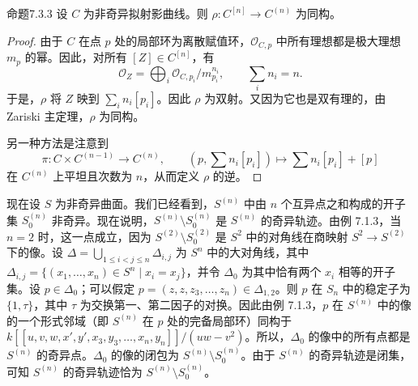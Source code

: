 \begin{origstatement}{命题}{7.3.3}\label{ch07:7.3.3}
设 $C$ 为非奇异拟射影曲线。则 $\rho:C^{[n]}\to C^{(n)}$ 为同构。
\end{origstatement}
\begin{proof}
由于 $C$ 在点 $p$ 处的局部环为离散赋值环，$\mathcal O_{C,p}$ 中所有理想都是极大理想 $m_p$ 的幂。因此，对所有 $[Z]\in C^{[n]}$，有
\[
\mathcal O_Z=\bigoplus_i\mathcal O_{C,p_i}/m_{p_i}^{n_i},\qquad
\sum_i n_i=n.
\]
于是，$\rho$ 将 $Z$ 映到 $\sum_i n_i[p_i]$。因此 $\rho$ 为双射。又因为它也是双有理的，由 Zariski 主定理，$\rho$ 为同构。

另一种方法是注意到
\[
\pi:C\times C^{(n-1)}\longrightarrow C^{(n)},\qquad
\left(p,\sum n_i[p_i]\right)\longmapsto\sum n_i[p_i]+[p]
\]
在 $C^{(n)}$ 上平坦且次数为 $n$，从而定义 $\rho$ 的逆。
\end{proof}
现在设 $S$ 为非奇异曲面。我们已经看到，$S^{(n)}$ 中由 $n$ 个互异点之和构成的开子集 $S_0^{(n)}$ 非奇异。现在说明，$S^{(n)}\setminus S_0^{(n)}$ 是 $S^{(n)}$ 的奇异轨迹。由例 7.1.3，当 $n=2$ 时，这一点成立，因为 $S^{(2)}\setminus S_0^{(2)}$ 是 $S^2$ 中的对角线在商映射 $S^2\to S^{(2)}$ 下的像。设 $\Delta=\bigcup_{1\leq i<j\leq n}\Delta_{i,j}$ 为 $S^n$ 中的大对角线，其中 $\Delta_{i,j}=\{(x_1,\ldots,x_n)\in S^n\mid x_i=x_j\}$，并令 $\Delta_0$ 为其中恰有两个 $x_i$ 相等的开子集。设 $p\in\Delta_0$；可以假定 $p=(z,z,z_3,\ldots,z_n)\in\Delta_{1,2}$。则 $p$ 在 $S_n$ 中的稳定子为 $\{1,\tau\}$，其中 $\tau$ 为交换第一、第二因子的对换。因此由例 7.1.3，$p$ 在 $S^{(n)}$ 中的像的一个形式邻域（即 $S^{(n)}$ 在 $p$ 处的完备局部环）同构于 $k[[u,v,w,x',y',x_3,y_3,\ldots,x_n,y_n]]/(uw-v^2)$。所以，$\Delta_0$ 的像中的所有点都是 $S^{(n)}$ 的奇异点。$\Delta_0$ 的像的闭包为 $S^{(n)}\setminus S_0^{(n)}$。由于 $S^{(n)}$ 的奇异轨迹是闭集，可知 $S^{(n)}$ 的奇异轨迹恰为 $S^{(n)}\setminus S_0^{(n)}$。

